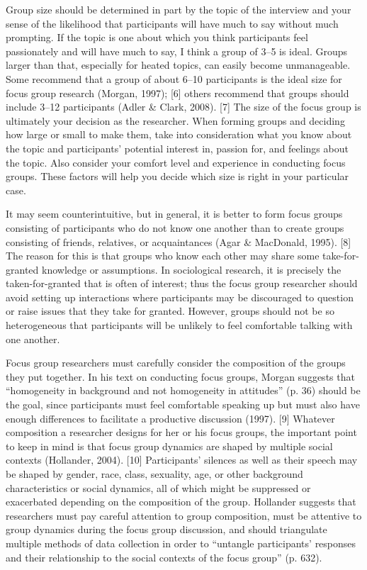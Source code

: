 Group size should be determined in part by the topic of the interview and your sense of the likelihood that participants will have much to say without much prompting. If the topic is one about which you think participants feel passionately and will have much to say, I think a group of 3–5 is ideal. Groups larger than that, especially for heated topics, can easily become unmanageable. Some recommend that a group of about 6–10 participants is the ideal size for focus group research (Morgan, 1997); [6] others recommend that groups should include 3–12 participants (Adler \& Clark, 2008). [7] The size of the focus group is ultimately your decision as the researcher. When forming groups and deciding how large or small to make them, take into consideration what you know about the topic and participants’ potential interest in, passion for, and feelings about the topic. Also consider your comfort level and experience in conducting focus groups. These factors will help you decide which size is right in your particular case.

It may seem counterintuitive, but in general, it is better to form focus groups consisting of participants who do not know one another than to create groups consisting of friends, relatives, or acquaintances (Agar \& MacDonald, 1995). [8] The reason for this is that groups who know each other may share some take-for-granted knowledge or assumptions. In sociological research, it is precisely the taken-for-granted that is often of interest; thus the focus group researcher should avoid setting up interactions where participants may be discouraged to question or raise issues that they take for granted. However, groups should not be so heterogeneous that participants will be unlikely to feel comfortable talking with one another.

Focus group researchers must carefully consider the composition of the groups they put together. In his text on conducting focus groups, Morgan suggests that “homogeneity in background and not homogeneity in attitudes” (p. 36) should be the goal, since participants must feel comfortable speaking up but must also have enough differences to facilitate a productive discussion (1997). [9] Whatever composition a researcher designs for her or his focus groups, the important point to keep in mind is that focus group dynamics are shaped by multiple social contexts (Hollander, 2004). [10] Participants’ silences as well as their speech may be shaped by gender, race, class, sexuality, age, or other background characteristics or social dynamics, all of which might be suppressed or exacerbated depending on the composition of the group. Hollander suggests that researchers must pay careful attention to group composition, must be attentive to group dynamics during the focus group discussion, and should triangulate multiple methods of data collection in order to “untangle participants’ responses and their relationship to the social contexts of the focus group” (p. 632).

